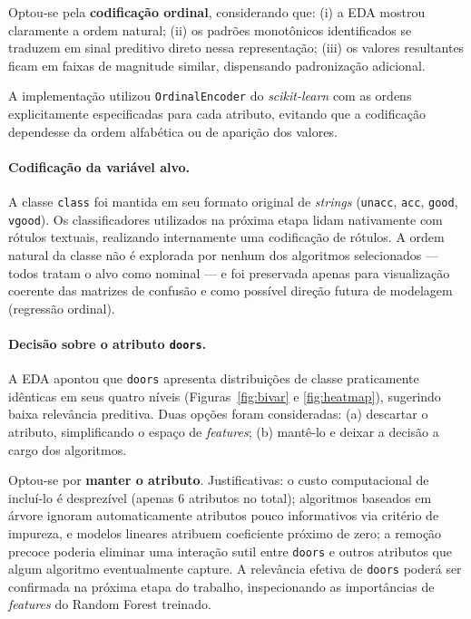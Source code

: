 \documentclass[11pt,a4paper]{article}
\newcommand{\code}[1]{\texttt{\small #1}}
\begin{document}
Optou-se pela \textbf{codificação ordinal}, considerando que: (i) a EDA mostrou claramente a ordem natural; (ii) os padrões monotônicos identificados se traduzem em sinal preditivo direto nessa representação; (iii) os valores resultantes ficam em faixas de magnitude similar, dispensando padronização adicional.

A implementação utilizou \code{OrdinalEncoder} do \textit{scikit-learn} com as ordens explicitamente especificadas para cada atributo, evitando que a codificação dependesse da ordem alfabética ou de aparição dos valores.

\paragraph{Codificação da variável alvo.}
A classe \code{class} foi mantida em seu formato original de \textit{strings} (\code{unacc}, \code{acc}, \code{good}, \code{vgood}). Os classificadores utilizados na próxima etapa lidam nativamente com rótulos textuais, realizando internamente uma codificação de rótulos. A ordem natural da classe não é explorada por nenhum dos algoritmos selecionados --- todos tratam o alvo como nominal --- e foi preservada apenas para visualização coerente das matrizes de confusão e como possível direção futura de modelagem (regressão ordinal).

\paragraph{Decisão sobre o atributo \code{doors}.}
A EDA apontou que \code{doors} apresenta distribuições de classe praticamente idênticas em seus quatro níveis (Figuras~\ref{fig:bivar} e \ref{fig:heatmap}), sugerindo baixa relevância preditiva. Duas opções foram consideradas: (a) descartar o atributo, simplificando o espaço de \textit{features}; (b) mantê-lo e deixar a decisão a cargo dos algoritmos.

Optou-se por \textbf{manter o atributo}. Justificativas: o custo computacional de incluí-lo é desprezível (apenas 6 atributos no total); algoritmos baseados em árvore ignoram automaticamente atributos pouco informativos via critério de impureza, e modelos lineares atribuem coeficiente próximo de zero; a remoção precoce poderia eliminar uma interação sutil entre \code{doors} e outros atributos que algum algoritmo eventualmente capture. A relevância efetiva de \code{doors} poderá ser confirmada na próxima etapa do trabalho, inspecionando as importâncias de \textit{features} do Random Forest treinado.
\end{document}
